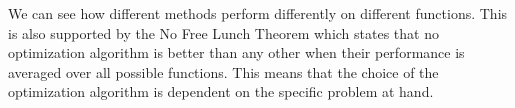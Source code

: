 We can see how different methods perform differently on different functions. This is also supported by the No Free Lunch Theorem which states that no optimization algorithm is better than any other when their performance is averaged over all possible functions. This means that the choice of the optimization algorithm is dependent on the specific problem at hand.